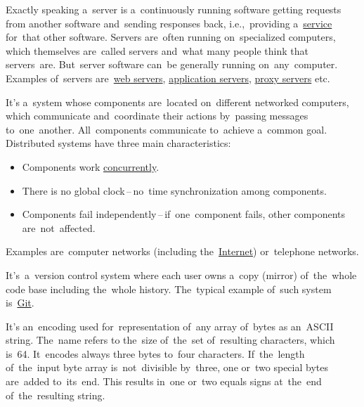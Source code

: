\label{server}
Exactly speaking a~server is a~continuously running software getting requests from another software and~sending responses back, i.e.,~providing a~\hyperref[applicationprocessprogramservicethread]{service} for~that other software. Servers are~often running on~specialized computers, which themselves are~called servers and~what many people think that servers~are. But~server software can~be generally running on~any~computer.
Examples of~servers are~\hyperref[webserver]{web servers}, \hyperref[applicationserver]{application servers}, \hyperref[proxy]{proxy servers} etc.

\label{distributedsystem}
It's a~system whose components are~located on~different networked computers, which communicate and~coordinate their actions by~passing messages to~one~another. All~components communicate to~achieve a~common goal. Distributed systems have three main characteristics:
\begin{itemize}
    \item Components work \hyperref[concurrency]{concurrently}.
    \item There is no global clock\,--\,no~time synchronization among components.
    \item Components fail independently\,--\,if~one~component fails, other components are~not~affected.
\end{itemize}
\noindent Examples are~computer networks (including the~\hyperref[internetweb]{Internet}) or~telephone networks.

\label{distributedversioncontrolsystem}
It's~a~version control system where each user owns a~copy (mirror) of~the~whole code base including the~whole history. The~typical example of~such system is~\hyperref[git]{Git}.

\label{multitasking}

\label{concurrency}

\label{loosetightcoupling}

\label{base64}
It's an~encoding used for~representation of~any array of~bytes as an~ASCII string. The~name refers to the~size of~the~set of~resulting characters, which is~64. It~encodes always three bytes to~four characters. If~the~length of~the~input byte array is~not~divisible by~three, one or~two special bytes are~added to~its~end. This results in~one or~two equals signs at~the~end of~the~resulting string.

